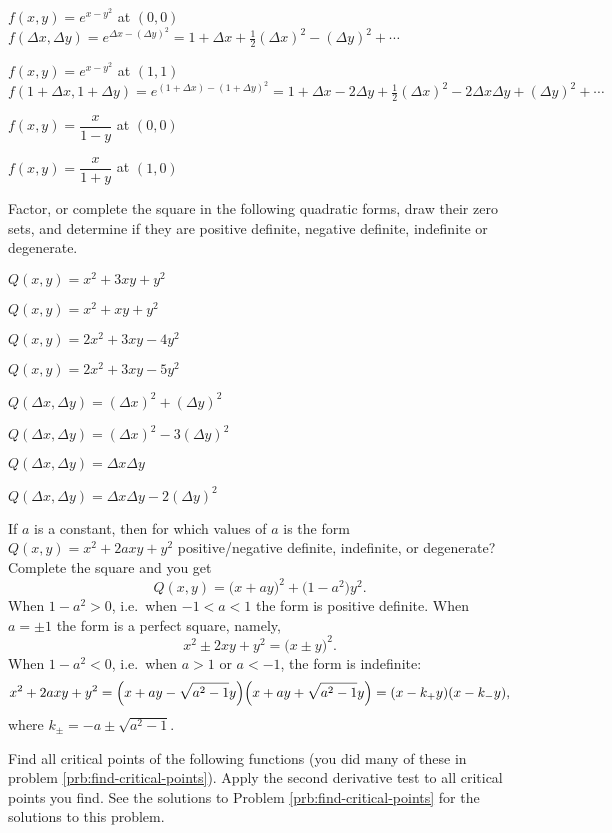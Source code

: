 \begin{multicols}{2}
\subprob  $f(x, y) =e^{x-y^2}$ at $(0,0)$ 
\answer
$f(\Delta x,\Delta y) = e^{\Delta x-(\Delta y)^2} =
1+\Delta x+\frac{1}{2}(\Delta x)^2 -(\Delta y)^2+\cdots$
\endanswer

\subprob  $f(x, y) =e^{x-y^2}$ at $(1,1)$
\answer
$f(1+\Delta x, 1+\Delta y)
= e^{(1+\Delta x)-(1+\Delta y)^2}
=
1+\Delta x - 2\Delta y+ \frac{1}{2}(\Delta x)^2 - 2\Delta x\Delta y
+(\Delta y)^2+\cdots$
\endanswer

\subprob  $f(x, y) =\dfrac{x}{1-y}$ at $(0,0)$ 

\subprob  $f(x, y) =\dfrac{x}{1+y}$ at $(1,0)$ 

\problem Factor, or complete the square in the following quadratic 
forms, draw their zero sets, and determine if they are positive
definite, negative definite, indefinite or degenerate.

\subprob $Q(x, y) = x^2+3xy+y^2$ 

\subprob $Q(x, y) = x^2 + xy + y^2$  

\subprob $Q(x, y) = 2x^2 +3xy - 4y^2$  

\subprob $Q(x, y) = 2x^2 + 3xy - 5y^2$ 

\subprob $Q(\Delta x, \Delta y) = (\Delta x)^2 + (\Delta y)^2$  

\subprob $Q(\Delta x, \Delta y) = (\Delta x)^2 - 3(\Delta y)^2$  

\subprob $Q(\Delta x, \Delta y) = \Delta x \Delta y$ 

\subprob $Q(\Delta x, \Delta y) = \Delta x \Delta y -2 (\Delta y)^2$ 

\problem If $a$ is a constant, then for which values 
of $a$ is the form $Q(x, y) = x^2 + 2axy + y^2$ positive/negative
definite, indefinite, or degenerate?
\answer  
Complete the square and you get
\[
Q(x, y) = \bigl(x+ay\bigr)^2 + \bigl(1- a^2\bigr)y^2. 
\]
When $1-a^2>0$, i.e.\ when $-1<a<1$ the form is positive definite.
When $a=\pm 1$ the form is a perfect square, namely, 
\[
x^2 \pm 2xy + y^2 = \bigl(x\pm y\bigr)^2.
\]
When $1-a^2<0$, i.e.\ when $a>1$ or $a<-1$, the form is indefinite:
\[
x^2 + 2axy + y^2 = 
\Bigl(x+ay-\sqrt{a^2-1}y\Bigr)
\Bigl(x+ay+\sqrt{a^2-1}y\Bigr)
=(x-k_+y)(x-k_-y),
\]
where $k_\pm = -a \pm \sqrt{a^2-1}$.

\endanswer

\problem \label{prb:lots-of-2nd-deriv-tests} 
Find all critical points of the following functions (you did many of
these in problem \ref{prb:find-critical-points}).  Apply the second
derivative test to all critical points you find.
\answer 
See the solutions to Problem \ref{prb:find-critical-points} for the
solutions to this problem.
\endanswer


\end{multicols}
